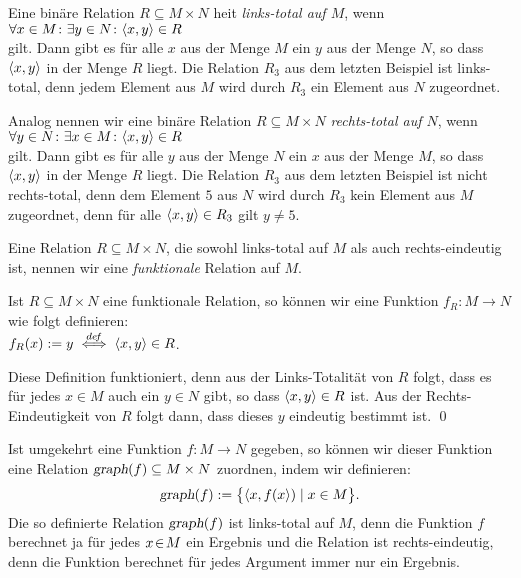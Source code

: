 \begin{Definition}
  Eine bin\"{a}re Relation $R \subseteq M \times N$ hei\3t \emph{links-total auf $M$}, wenn \\[0.2cm]
  \hspace*{1.3cm} $\forall x \in M \colon \exists y \in N \colon \pair(x,y) \in R$ \\[0.2cm]
  gilt. Dann gibt es f\"{u}r alle $x$ aus der Menge $M$ ein $y$ aus der Menge $N$, so dass
  $\pair(x,y)$ in der Menge  $R$ liegt.  Die Relation $R_3$ aus dem letzten Beispiel ist
  links-total, denn jedem Element aus $M$ wird durch $R_3$ ein Element aus $N$ zugeordnet.

  Analog nennen wir eine bin\"{a}re Relation $R \subseteq M \times N$  \emph{rechts-total auf $N$}, wenn \\[0.2cm]
  \hspace*{1.3cm} $\forall y \in N \colon \exists x \in M \colon \pair(x,y) \in R$ \\[0.2cm]
  gilt. Dann gibt es f\"{u}r alle $y$ aus der Menge $N$ ein $x$ aus der Menge $M$, so dass
  $\pair(x,y)$ in der Menge  $R$ liegt.  Die Relation $R_3$ aus dem letzten Beispiel ist
  nicht rechts-total, denn dem Element $5$ aus $N$ wird durch $R_3$ kein Element aus $M$
  zugeordnet, denn f\"{u}r alle $\pair(x,y) \in R_3$ gilt $y \not= 5$. \eox
\end{Definition}

\begin{Definition}
Eine Relation $R \subseteq M \times N$, die sowohl links-total auf $M$ als auch rechts-eindeutig
ist, nennen wir eine \emph{funktionale} Relation auf $M$.    \eox
\end{Definition}


\begin{Satz}
Ist $R \subseteq M \times N$ eine
funktionale Relation, so k\"{o}nnen wir eine Funktion $f_R\colon M \rightarrow N$ wie folgt
definieren: \\[0.2cm]
\hspace*{1.3cm} $f_R(x) := y \;\stackrel{de\!f}{\Longleftrightarrow}\; \pair(x,y) \in R$. 
\end{Satz}

\proof
Diese Definition funktioniert, denn aus der Links-Totalit\"{a}t von $R$ folgt, dass es f\"{u}r
jedes $x\in M$ auch ein $y \in N$ gibt, so dass $\pair(x,y) \in R$ ist.  Aus der
Rechts-Eindeutigkeit von $R$ folgt dann, dass dieses $y$ eindeutig bestimmt ist. \qed

\remark
Ist umgekehrt eine Funktion \mbox{$f:M \rightarrow N$} gegeben, so k\"{o}nnen wir dieser Funktion
eine Relation $\textsl{graph}(f) \subseteq M \times N$ zuordnen, indem wir definieren: 
\[ \textsl{graph}(f) := \bigl\{ \pair(x,f(x)) \mid  x\in M \bigr\}. \]
Die so definierte Relation $\textsl{graph}(f)$ ist links-total auf $M$, denn die Funktion $f$
berechnet ja f\"{u}r jedes $x \!\in\! M$ ein Ergebnis und die Relation ist rechts-eindeutig,
denn die Funktion berechnet f\"{u}r jedes Argument immer nur ein Ergebnis. \eox

